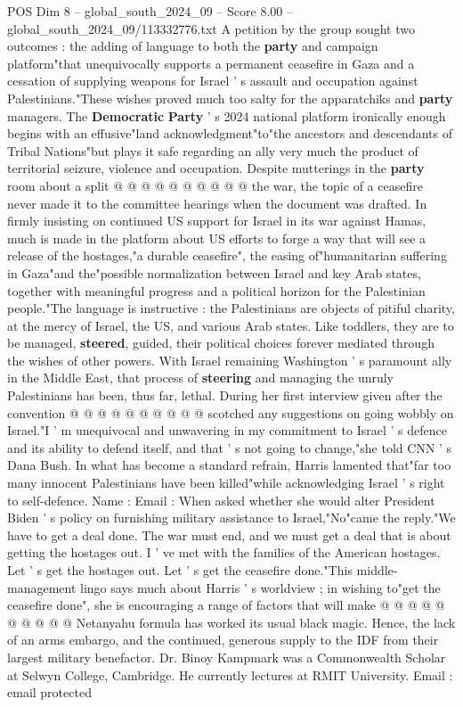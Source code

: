 \begin{textsample}{POS Dim 8 – global\_south\_2024\_09 – Score 8.00 – global\_south\_2024\_09/113332776.txt}
A petition by the group sought two outcomes : the adding of language to both the \textbf{party} and campaign platform"that unequivocally supports a permanent ceasefire in Gaza and a cessation of supplying weapons for Israel ' s assault and occupation against Palestinians."These wishes proved much too salty for the apparatchiks and \textbf{party} managers.
The \textbf{Democratic} \textbf{Party} ' s 2024 national platform ironically enough begins with an effusive"land acknowledgment"to"the ancestors and descendants of Tribal Nations"but plays it safe regarding an ally very much the product of territorial seizure, violence and occupation.
Despite mutterings in the \textbf{party} room about a split @ @ @ @ @ @ @ @ @ @ the war, the topic of a ceasefire never made it to the committee hearings when the document was drafted.
In firmly insisting on continued US support for Israel in its war against Hamas, much is made in the platform about US efforts to forge a way that will see a release of the hostages,"a durable ceasefire", the easing of"humanitarian suffering in Gaza"and the"possible normalization between Israel and key Arab states, together with meaningful progress and a political horizon for the Palestinian people."The language is instructive : the Palestinians are objects of pitiful charity, at the mercy of Israel, the US, and various Arab states.
Like toddlers, they are to be managed, \textbf{steered}, guided, their political choices forever mediated through the wishes of other powers.
With Israel remaining Washington ' s paramount ally in the Middle East, that process of \textbf{steering} and managing the unruly Palestinians has been, thus far, lethal.
During her first interview given after the convention @ @ @ @ @ @ @ @ @ @ scotched any suggestions on going wobbly on Israel."I ' m unequivocal and unwavering in my commitment to Israel ' s defence and its ability to defend itself, and that ' s not going to change,"she told CNN ' s Dana Bush.
In what has become a standard refrain, Harris lamented that"far too many innocent Palestinians have been killed"while acknowledging Israel ' s right to self-defence.
Name : Email : When asked whether she would alter President Biden ' s policy on furnishing military assistance to Israel,"No"came the reply."We have to get a deal done.
The war must end, and we must get a deal that is about getting the hostages out.
I ' ve met with the families of the American hostages.
Let ' s get the hostages out.
Let ' s get the ceasefire done."This middle-management lingo says much about Harris ' s worldview ; in wishing to"get the ceasefire done", she is encouraging a range of factors that will make @ @ @ @ @ @ @ @ @ @ Netanyahu formula has worked its usual black magic.
Hence, the lack of an arms embargo, and the continued, generous supply to the IDF from their largest military benefactor.
Dr.
Binoy Kampmark was a Commonwealth Scholar at Selwyn College, Cambridge.
He currently lectures at RMIT University.
Email : email protected

\end{textsample}

